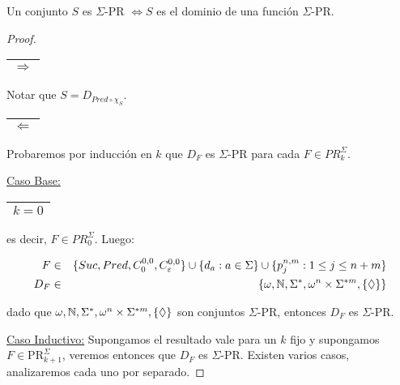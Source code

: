   \begin{proposition}
    \PN Un conjunto $S$ es $\Sigma$-PR $\Leftrightarrow S$ es el dominio de una función $\Sigma$-PR.
  \end{proposition}
  \begin{proof}
    \begin{tabular}{|c|} \hline $\Rightarrow$ \\\hline \end{tabular} Notar que $S = D_{Pred \circ \chi_{S}}$.

    \PN \begin{tabular}{|c|} \hline $\Leftarrow$ \\\hline \end{tabular} Probaremos por inducción en $k$ que $D_{F}$ es
    $\Sigma$-PR para cada $F \in PR_{k}^{\Sigma}$.

    \vspace{3mm}
    \PN \underline{Caso Base:} \begin{tabular}{|c|} \hline $k = 0$ \\\hline \end{tabular} es decir, $F
    \in PR_{0}^{\Sigma}$. Luego:

    \begin{eqnarray*}
      F &\in& \{Suc, Pred, C_{0}^{0,0}, C_{\varepsilon}^{0,0}\} \cup \{d_{a}: a \in \Sigma\} \cup \{p_{j}^{n,m}: 1 \leq
      j \leq n+m\} \\
      D_{F} &\in& \{\omega, \mathbb{N}, \Sigma^{\ast}, \omega^{n} \times \Sigma^{\ast m}, \{\Diamond\}\}
    \end{eqnarray*}

    \PN dado que $\omega, \mathbb{N}, \Sigma^{\ast}, \omega^{n} \times \Sigma^{\ast m}, \{\Diamond\}$ son conjuntos
    $\Sigma$-PR, entonces $D_{F}$ es $\Sigma$-PR.

    \vspace{3mm}
    \PN \underline{Caso Inductivo:} Supongamos el resultado vale para un $k$ fijo y supongamos $F \in
    \mathrm{PR}_{k+1}^{\Sigma}$, veremos entonces que $D_{F}$ es $\Sigma$-PR. Existen varios casos, analizaremos cada
    uno por separado.


\end{proof}
